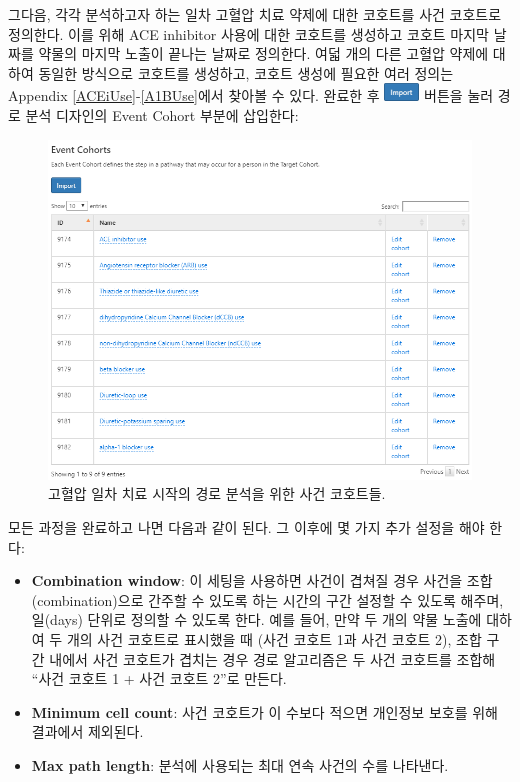 \documentclass[11pt]{book}
\providecommand{\tightlist}{%
  \setlength{\itemsep}{0pt}\setlength{\parskip}{0pt}}
\theoremstyle{definition}
\theoremstyle{definition}
\theoremstyle{definition}
\theoremstyle{remark}
\begin{document}
그다음, 각각 분석하고자 하는 일차 고혈압 치료 약제에 대한 코호트를 사건
코호트로 정의한다. 이를 위해 ACE inhibitor 사용에 대한 코호트를 생성하고
코호트 마지막 날짜를 약물의 마지막 노출이 끝나는 날짜로 정의한다. 여덟
개의 다른 고혈압 약제에 대하여 동일한 방식으로 코호트를 생성하고, 코호트
생성에 필요한 여러 정의는 Appendix \ref{ACEiUse}-\ref{A1BUse}에서 찾아볼
수 있다. 완료한 후
\includegraphics{images/Characterization/atlasImportButton.png} 버튼을
눌러 경로 분석 디자인의 Event Cohort 부분에 삽입한다:

\begin{figure}

{\centering \includegraphics[width=1\linewidth]{images/Characterization/atlasPathwaysEventCohorts} 

}

\caption{고혈압 일차 치료 시작의 경로 분석을 위한 사건 코호트들.}\label{fig:atlasPathwaysEventCohorts}
\end{figure}

모든 과정을 완료하고 나면 다음과 같이 된다. 그 이후에 몇 가지 추가
설정을 해야 한다:

\begin{itemize}
\tightlist
\item
  \textbf{Combination window}: 이 세팅을 사용하면 사건이 겹쳐질 경우
  사건을 조합(combination)으로 간주할 수 있도록 하는 시간의 구간 설정할
  수 있도록 해주며, 일(days) 단위로 정의할 수 있도록 한다. 예를 들어,
  만약 두 개의 약물 노출에 대하여 두 개의 사건 코호트로 표시했을 때
  (사건 코호트 1과 사건 코호트 2), 조합 구간 내에서 사건 코호트가 겹치는
  경우 경로 알고리즘은 두 사건 코호트를 조합해 ``사건 코호트 1 + 사건
  코호트 2''로 만든다.
\item
  \textbf{Minimum cell count}: 사건 코호트가 이 수보다 적으면 개인정보
  보호를 위해 결과에서 제외된다.
\item
  \textbf{Max path length}: 분석에 사용되는 최대 연속 사건의 수를
  나타낸다.
\end{itemize}
\end{document}
